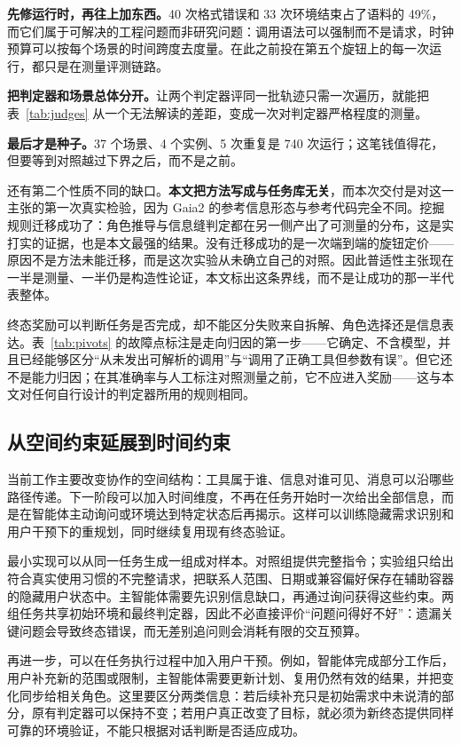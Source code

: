 \documentclass[UTF8,11pt,fontset=fandol]{ctexart}
\begin{document}
\textbf{先修运行时，再往上加东西。}40 次格式错误和 33 次环境结束占了语料的 49\%，而它们属于可解决的工程问题而非研究问题：调用语法可以强制而不是请求，时钟预算可以按每个场景的时间跨度去度量。在此之前投在第五个旋钮上的每一次运行，都只是在测量评测链路。

\textbf{把判定器和场景总体分开。}让两个判定器评同一批轨迹只需一次遍历，就能把表~\ref{tab:judges} 从一个无法解读的差距，变成一次对判定器严格程度的测量。

\textbf{最后才是种子。}37 个场景、4 个实例、5 次重复是 740 次运行；这笔钱值得花，但要等到对照越过下界之后，而不是之前。

还有第二个性质不同的缺口。\textbf{本文把方法写成与任务库无关}，而本次交付是对这一主张的第一次真实检验，因为 Gaia2 的参考信息形态与参考代码完全不同。挖掘规则迁移成功了：角色推导与信息缝判定都在另一侧产出了可测量的分布，这是实打实的证据，也是本文最强的结果。没有迁移成功的是一次端到端的旋钮定价——原因不是方法未能迁移，而是这次实验从未确立自己的对照。因此普适性主张现在一半是测量、一半仍是构造性论证，本文标出这条界线，而不是让成功的那一半代表整体。

终态奖励可以判断任务是否完成，却不能区分失败来自拆解、角色选择还是信息表达。表~\ref{tab:pivots} 的故障点标注是走向归因的第一步——它确定、不含模型，并且已经能够区分“从未发出可解析的调用”与“调用了正确工具但参数有误”。但它还不是能力归因；在其准确率与人工标注对照测量之前，它不应进入奖励——这与本文对任何自行设计的判定器所用的规则相同。

\subsection{从空间约束延展到时间约束}

当前工作主要改变协作的空间结构：工具属于谁、信息对谁可见、消息可以沿哪些路径传递。下一阶段可以加入时间维度，不再在任务开始时一次给出全部信息，而是在智能体主动询问或环境达到特定状态后再揭示。这样可以训练隐藏需求识别和用户干预下的重规划，同时继续复用现有终态验证。

最小实现可以从同一任务生成一组成对样本。对照组提供完整指令；实验组只给出符合真实使用习惯的不完整请求，把联系人范围、日期或兼容偏好保存在辅助容器的隐藏用户状态中。主智能体需要先识别信息缺口，再通过询问获得这些约束。两组任务共享初始环境和最终判定器，因此不必直接评价“问题问得好不好”：遗漏关键问题会导致终态错误，而无差别追问则会消耗有限的交互预算。

再进一步，可以在任务执行过程中加入用户干预。例如，智能体完成部分工作后，用户补充新的范围或限制，主智能体需要更新计划、复用仍然有效的结果，并把变化同步给相关角色。这里要区分两类信息：若后续补充只是初始需求中未说清的部分，原有判定器可以保持不变；若用户真正改变了目标，就必须为新终态提供同样可靠的环境验证，不能只根据对话判断是否适应成功。
\end{document}
